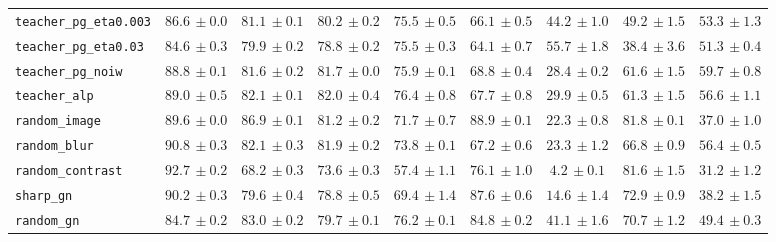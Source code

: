 \begin{tabular}{lcccccccc}
\texttt{teacher\_pg\_eta0.003} & $86.6{\scriptstyle\,\pm0.0}$ & $81.1{\scriptstyle\,\pm0.1}$ & $80.2{\scriptstyle\,\pm0.2}$ & $75.5{\scriptstyle\,\pm0.5}$ & $66.1{\scriptstyle\,\pm0.5}$ & $44.2{\scriptstyle\,\pm1.0}$ & $49.2{\scriptstyle\,\pm1.5}$ & $53.3{\scriptstyle\,\pm1.3}$ \\
\texttt{teacher\_pg\_eta0.03} & $84.6{\scriptstyle\,\pm0.3}$ & $79.9{\scriptstyle\,\pm0.2}$ & $78.8{\scriptstyle\,\pm0.2}$ & $75.5{\scriptstyle\,\pm0.3}$ & $64.1{\scriptstyle\,\pm0.7}$ & $55.7{\scriptstyle\,\pm1.8}$ & $38.4{\scriptstyle\,\pm3.6}$ & $51.3{\scriptstyle\,\pm0.4}$ \\
\texttt{teacher\_pg\_noiw} & $88.8{\scriptstyle\,\pm0.1}$ & $81.6{\scriptstyle\,\pm0.2}$ & $81.7{\scriptstyle\,\pm0.0}$ & $75.9{\scriptstyle\,\pm0.1}$ & $68.8{\scriptstyle\,\pm0.4}$ & $28.4{\scriptstyle\,\pm0.2}$ & $61.6{\scriptstyle\,\pm1.5}$ & $59.7{\scriptstyle\,\pm0.8}$ \\
\texttt{teacher\_alp} & $89.0{\scriptstyle\,\pm0.5}$ & $82.1{\scriptstyle\,\pm0.1}$ & $82.0{\scriptstyle\,\pm0.4}$ & $76.4{\scriptstyle\,\pm0.8}$ & $67.7{\scriptstyle\,\pm0.8}$ & $29.9{\scriptstyle\,\pm0.5}$ & $61.3{\scriptstyle\,\pm1.5}$ & $56.6{\scriptstyle\,\pm1.1}$ \\
\texttt{random\_image} & $89.6{\scriptstyle\,\pm0.0}$ & $86.9{\scriptstyle\,\pm0.1}$ & $81.2{\scriptstyle\,\pm0.2}$ & $71.7{\scriptstyle\,\pm0.7}$ & $88.9{\scriptstyle\,\pm0.1}$ & $22.3{\scriptstyle\,\pm0.8}$ & $81.8{\scriptstyle\,\pm0.1}$ & $37.0{\scriptstyle\,\pm1.0}$ \\
\texttt{random\_blur} & $90.8{\scriptstyle\,\pm0.3}$ & $82.1{\scriptstyle\,\pm0.3}$ & $81.9{\scriptstyle\,\pm0.2}$ & $73.8{\scriptstyle\,\pm0.1}$ & $67.2{\scriptstyle\,\pm0.6}$ & $23.3{\scriptstyle\,\pm1.2}$ & $66.8{\scriptstyle\,\pm0.9}$ & $56.4{\scriptstyle\,\pm0.5}$ \\
\texttt{random\_contrast} & $92.7{\scriptstyle\,\pm0.2}$ & $68.2{\scriptstyle\,\pm0.3}$ & $73.6{\scriptstyle\,\pm0.3}$ & $57.4{\scriptstyle\,\pm1.1}$ & $76.1{\scriptstyle\,\pm1.0}$ & $4.2{\scriptstyle\,\pm0.1}$ & $81.6{\scriptstyle\,\pm1.5}$ & $31.2{\scriptstyle\,\pm1.2}$ \\
\texttt{sharp\_gn} & $90.2{\scriptstyle\,\pm0.3}$ & $79.6{\scriptstyle\,\pm0.4}$ & $78.8{\scriptstyle\,\pm0.5}$ & $69.4{\scriptstyle\,\pm1.4}$ & $87.6{\scriptstyle\,\pm0.6}$ & $14.6{\scriptstyle\,\pm1.4}$ & $72.9{\scriptstyle\,\pm0.9}$ & $38.2{\scriptstyle\,\pm1.5}$ \\
\texttt{random\_gn} & $84.7{\scriptstyle\,\pm0.2}$ & $83.0{\scriptstyle\,\pm0.2}$ & $79.7{\scriptstyle\,\pm0.1}$ & $76.2{\scriptstyle\,\pm0.1}$ & $84.8{\scriptstyle\,\pm0.2}$ & $41.1{\scriptstyle\,\pm1.6}$ & $70.7{\scriptstyle\,\pm1.2}$ & $49.4{\scriptstyle\,\pm0.3}$ \\

\end{tabular}

